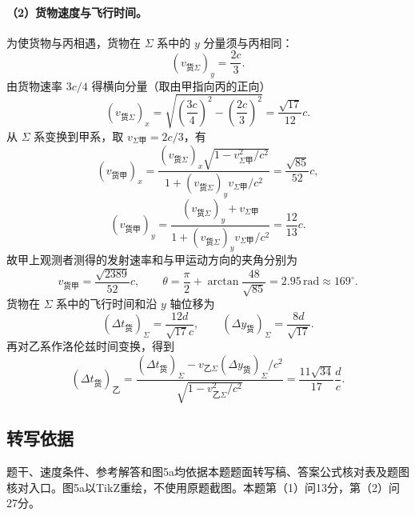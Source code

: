 \paragraph{（2）货物速度与飞行时间。}
为使货物与丙相遇，货物在 $\Sigma$ 系中的 $y$ 分量须与丙相同：
\[
(v_{\text{货}\Sigma})_y=\frac{2c}{3}.
\]
由货物速率 $3c/4$ 得横向分量（取由甲指向丙的正向）
\[
(v_{\text{货}\Sigma})_x
=\sqrt{\left(\frac{3c}{4}\right)^2-\left(\frac{2c}{3}\right)^2}
=\frac{\sqrt{17}}{12}c.
\]
从 $\Sigma$ 系变换到甲系，取 $v_{\Sigma\text{甲}}=2c/3$，有
\[
(v_{\text{货甲}})_x
=\frac{(v_{\text{货}\Sigma})_x\sqrt{1-v_{\Sigma\text{甲}}^2/c^2}}
{1+(v_{\text{货}\Sigma})_yv_{\Sigma\text{甲}}/c^2}
=\frac{\sqrt{85}}{52}c,
\]
\[
(v_{\text{货甲}})_y
=\frac{(v_{\text{货}\Sigma})_y+v_{\Sigma\text{甲}}}
{1+(v_{\text{货}\Sigma})_yv_{\Sigma\text{甲}}/c^2}
=\frac{12}{13}c.
\]
故甲上观测者测得的发射速率和与甲运动方向的夹角分别为
\[
\boxed{v_{\text{货甲}}=\frac{\sqrt{2389}}{52}c,\qquad
\theta=\frac\pi2+\arctan\frac{48}{\sqrt{85}}
=2.95\,\mathrm{rad}\approx169^\circ.}
\]
货物在 $\Sigma$ 系中的飞行时间和沿 $y$ 轴位移为
\[
(\Delta t_{\text{货}})_\Sigma=\frac{12d}{\sqrt{17}c},
\qquad
(\Delta y_{\text{货}})_\Sigma=\frac{8d}{\sqrt{17}}.
\]
再对乙系作洛伦兹时间变换，得到
\[
\boxed{(\Delta t_{\text{货}})_\text{乙}
=\frac{(\Delta t_{\text{货}})_\Sigma-v_{\text{乙}\Sigma}(\Delta y_{\text{货}})_\Sigma/c^2}
{\sqrt{1-v_{\text{乙}\Sigma}^2/c^2}}
=\frac{11\sqrt{34}}{17}\frac dc.}
\]

\subsection{转写依据}
题干、速度条件、参考解答和图5a均依据本题题面转写稿、答案公式核对表及题图核对入口。图5a以TikZ重绘，不使用原题截图。本题第（1）问13分，第（2）问27分。
